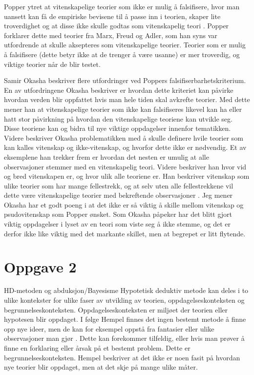 \documentclass[
]{book}
\begin{document}
Popper ytret at vitenskapelige teorier som ikke er mulig å falsifisere, hvor man uansett kan få de empiriske bevisene til å passe inn i teorien, skaper lite troverdighet og at disse ikke skulle godtas som vitenskapelig teori \citep{okasha2016}. Popper \citep{popper1969} forklarer dette med teorier fra Marx, Freud og Adler, som han syns var utfordrende at skulle aksepteres som vitenskapelige teorier. Teorier som er mulig å falsifisere (dette betyr ikke at de trenger å være usanne) er mer troverdig, og viktige teorier når de blir testet.

Samir Okasha \citep{okasha2016} beskriver flere utfordringer ved Poppers falsifiserbarhetskriterium. En av utfordringene Okasha beskriver er hvordan dette kriteriet kan påvirke hvordan verden blir oppfattet hvis man hele tiden skal avkrefte teorier. Med dette mener han at vitenskapelige teorier som ikke kan falsifiseres likevel kan ha eller hatt stor påvirkning på hvordan den vitenskapelige teoriene kan utvikle seg. Disse teoriene kan og bidra til nye viktige oppdagelser innenfor tematikken. Videre beskriver Okasha problematikken med å skulle definere hvile teorier som kan kalles vitenskap og ikke-vitenskap, og hvorfor dette ikke er nødvendig. Et av eksemplene han trekker frem er hvordan det nesten er umulig at alle observasjoner stemmer med en vitenskapelig teori. Videre beskriver han hvor vid og bred vitenskapen er, og hvor ulik alle teoriene er. Han beskriver vitenskap som ulike teorier som har mange fellestrekk, og at selv uten alle fellestrekkene vil dette være vitenskapelige teorier med bekreftende observasjoner \citep{okasha2016}. Jeg mener Okasha har et godt poeng i at det ikke er så viktig å skille mellom vitenskap og psudovitenskap som Popper ønsket. Som Okasha påpeker har det blitt gjort viktig oppdagelser i lyset av en teori som viste seg å ikke stemme, og det er derfor ikke like viktig med det markante skillet, men at begrepet er litt flytende.

\hypertarget{oppgave-2}{%
\section{Oppgave 2}\label{oppgave-2}}

HD-metoden og abduksjon/Bayesisme Hypotetisk deduktiv metode kan deles i to ulike kontekster for ulike faser av utvikling av teorien, oppdagelseskonteksten og begrunnelseskonteksten. Oppdagelseskonteksten er miljøet der teorien eller hypotesen blir oppdaget. I følge Hempel finnes det ingen bestemt metode å finne opp nye ideer, men de kan for eksempel oppstå fra fantasier eller ulike observasjoner man gjør \citep{dellsén2021}. Dette kan forekommer tilfeldig, eller hvis man prøver å finne en forklaring eller årsak på et bestemt problem. Dette er begrunnelseskonteksten. Hempel \citep{hempel1966} beskriver at det ikke er noen fasit på hvordan nye teorier blir oppdaget, men at det skje på mange ulike måter.
\end{document}

